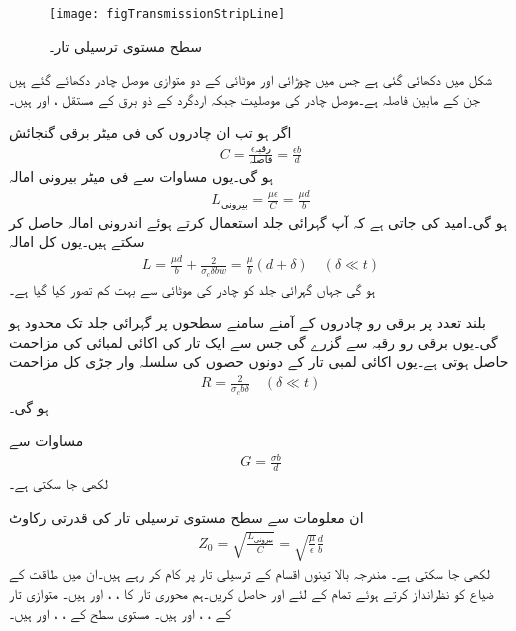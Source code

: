 \begin{figure}
\centering
\texttt{[image: figTransmissionStripLine]}
\caption{سطح مستوی ترسیلی تار۔}
\label{شکل_ترسیلی_سطح_مستوی}
\end{figure}

شکل  میں  دکھائی گئی ہے جس میں  چوڑائی اور  موٹائی کے دو متوازی موصل چادر دکھائے گئے ہیں جن کے مابین فاصلہ  ہے۔موصل چادر کی موصلیت  جبکہ اردگرد کے ذو برق کے مستقل ،  اور  ہیں۔

اگر  ہو تب ان چادروں کی فی میٹر برقی گنجائش  
\begin{align}
C=\frac{\epsilon \text{رقبہ}}{ \text{فاصلہ}} = \frac{\epsilon b}{d}
\end{align}
ہو گی۔یوں مساوات  سے فی میٹر بیرونی امالہ
\begin{align}
L_{\text{بیرونی}}=\frac{\mu \epsilon}{C}=\frac{\mu d}{b}
\end{align}
ہو گی۔امید کی جاتی ہے کہ آپ گہرائی جلد استعمال کرتے ہوئے اندرونی امالہ حاصل کر سکتے ہیں۔یوں کل امالہ
\begin{align}
L=\frac{\mu d}{b}+\frac{2}{\sigma_c \delta b w}=\frac{\mu}{b} (d+\delta) \quad (\delta \ll t)
\end{align}
ہو گی جہاں گہرائی جلد کو چادر کی موٹائی سے بہت کم تصور کیا گیا ہے۔

بلند تعدد پر برقی رو چادروں کے آمنے سامنے  سطحوں پر گہرائی جلد تک محدود ہو گی۔یوں برقی رو رقبہ  سے گزرے گی جس سے ایک تار کی اکائی لمبائی کی مزاحمت  حاصل ہوتی ہے۔یوں اکائی لمبی تار کے دونوں حصوں کی سلسلہ وار جڑی کل مزاحمت
\begin{align}
R=\frac{2}{\sigma_c b \delta} \quad (\delta \ll t)
\end{align}
ہو گی۔ 

مساوات  سے
\begin{align}
G=\frac{\sigma b}{d}
\end{align}
لکھی جا سکتی ہے۔

ان معلومات سے سطح مستوی ترسیلی تار کی قدرتی رکاوٹ
\begin{align}
Z_0=\sqrt{\frac{L_{\text{بیرونی}}}{C}}=\sqrt{\frac{\mu}{\epsilon}} \frac{d}{b}
\end{align}
لکھی جا سکتی ہے۔
مندرجہ بالا تینوں اقسام کے ترسیلی تار  پر کام کر رہے ہیں۔ان میں طاقت کے ضیاع کو نظرانداز کرتے ہوئے تمام کے لئے  اور  حاصل کریں۔ہم محوری تار کا ، ،  اور  ہیں۔ متوازی تار کے ، ،  اور  ہیں۔ مستوی سطح کے ، ،  اور  ہیں۔

